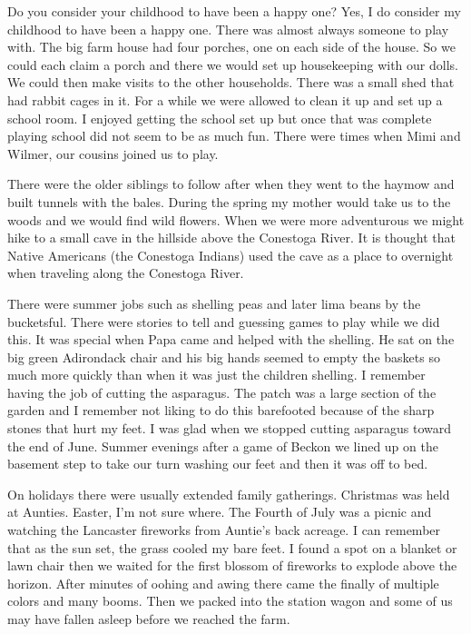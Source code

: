 Do you consider your childhood to have been a happy one?
Yes, I do consider my childhood to have been a happy one.
There was almost always someone to play with.
The big farm house had four porches, one on each side of the house.
So we could each claim a porch and there we would set up housekeeping with our dolls.
We could then make visits to the other households.
There was a small shed that had rabbit cages in it.
For a while we were allowed to clean it up and set up a school room.
I enjoyed getting the school set up but once that was complete playing school did not seem to be as much fun.
There were times when Mimi and Wilmer, our cousins joined us to play.

There were the older siblings to follow after when they went to the haymow and built tunnels with the bales.
During the spring my mother would take us to the woods and we would find wild flowers.
When we were more adventurous we might hike to a small cave in the hillside above the Conestoga River.
It is thought that Native Americans (the Conestoga Indians) used the cave as a place to overnight when traveling along the Conestoga River.

There were summer jobs such as shelling peas and later lima beans by the bucketsful.
There were stories to tell and guessing games to play while we did this.
It was special when Papa came and helped with the shelling.
He sat on the big green Adirondack chair and his big hands seemed to empty the baskets so much more quickly than when it was just the children shelling.
I remember having the job of cutting the asparagus.
The patch was a large section of the garden and I remember not liking to do this barefooted because of the sharp stones that hurt my feet.
I was glad when we stopped cutting asparagus toward the end of June.
Summer evenings after a game of Beckon we lined up on the basement step to take our turn washing our feet and then it was off to bed.

On holidays there were usually extended family gatherings.
Christmas was held at Aunties.
Easter, I'm not sure where.
The Fourth of July was a picnic and watching the Lancaster fireworks from Auntie's back acreage.
I can remember that as the sun set, the grass cooled my bare feet.
I found a spot on a blanket or lawn chair then we waited for the first blossom of fireworks to explode above the horizon.
After minutes of oohing and awing there came the finally of multiple colors and many booms.
Then we packed into the station wagon and some of us may have fallen asleep before we reached the farm.

